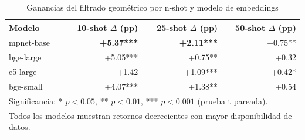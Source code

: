 \begin{table}[htbp]
\centering
\caption{Ganancias del filtrado geométrico por n-shot y modelo de embeddings}
\label{tab:embedding_nshot}
\begin{tabular}{lrrr}
\toprule
\textbf{Modelo} & \textbf{10-shot $\Delta$ (pp)} & \textbf{25-shot $\Delta$ (pp)} & \textbf{50-shot $\Delta$ (pp)} \\
\midrule
mpnet-base     & \textbf{+5.37***} & \textbf{+2.11***} & +0.75**  \\
bge-large      & +5.05***          & +0.75**           & +0.32    \\
e5-large       & +1.42             & +1.09***          & +0.42*   \\
bge-small      & +4.07***          & +1.38**           & +0.54    \\
\midrule
\multicolumn{4}{l}{\small Significancia: * $p<0.05$, ** $p<0.01$, *** $p<0.001$ (prueba t pareada).} \\
\multicolumn{4}{l}{\small Todos los modelos muestran retornos decrecientes con mayor disponibilidad de datos.} \\
\bottomrule
\end{tabular}
\end{table}
